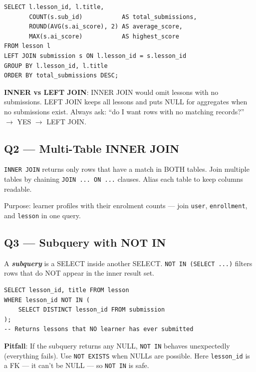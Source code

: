 \documentclass[11pt,a4paper]{article}
\newcommand{\term}[1]{\textbf{\textit{#1}}}
\newcommand{\T}[1]{\texttt{#1}}          %
\begin{document}
\begin{lstlisting}[style=sql]
SELECT l.lesson_id, l.title,
       COUNT(s.sub_id)           AS total_submissions,
       ROUND(AVG(s.ai_score), 2) AS average_score,
       MAX(s.ai_score)           AS highest_score
FROM lesson l
LEFT JOIN submission s ON l.lesson_id = s.lesson_id
GROUP BY l.lesson_id, l.title
ORDER BY total_submissions DESC;
\end{lstlisting}

\begin{keybox}
\textbf{INNER vs LEFT JOIN}: INNER JOIN would omit lessons with no submissions. LEFT JOIN
keeps all lessons and puts NULL for aggregates when no submissions exist. Always ask:
``do I want rows with no matching records?'' $\to$ YES $\to$ LEFT JOIN.
\end{keybox}

\subsection{Q2 — Multi-Table INNER JOIN}

\begin{defbox}
\T{INNER JOIN} returns only rows that have a match in BOTH tables. Join multiple tables
by chaining \T{JOIN ... ON ...} clauses. Alias each table to keep columns readable.
\end{defbox}

Purpose: learner profiles with their enrolment counts — join \T{user}, \T{enrollment},
and \T{lesson} in one query.

\subsection{Q3 — Subquery with NOT IN}

\begin{defbox}
A \term{subquery} is a SELECT inside another SELECT. \T{NOT IN (SELECT ...)} filters
rows that do NOT appear in the inner result set.
\end{defbox}

\begin{lstlisting}[style=sql]
SELECT lesson_id, title FROM lesson
WHERE lesson_id NOT IN (
    SELECT DISTINCT lesson_id FROM submission
);
-- Returns lessons that NO learner has ever submitted
\end{lstlisting}

\begin{warnbox}
\textbf{Pitfall}: If the subquery returns any NULL, \T{NOT IN} behaves unexpectedly
(everything fails). Use \T{NOT EXISTS} when NULLs are possible. Here \T{lesson\_id}
is a FK — it can't be NULL — so \T{NOT IN} is safe.
\end{warnbox}
\end{document}

